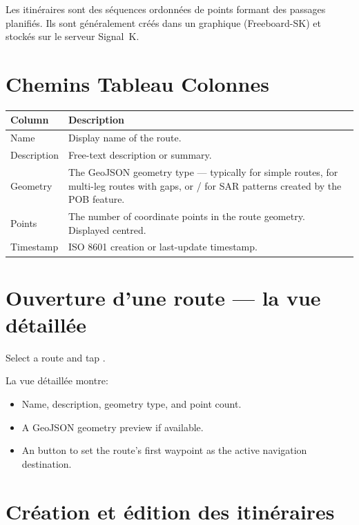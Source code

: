 Les itinéraires sont des séquences ordonnées de points formant des passages planifiés.
Ils sont généralement créés dans un graphique (Freeboard-SK) et stockés sur le serveur Signal~K.


\section{Chemins Tableau Colonnes}

\begin{longtable}{L{2.4cm} L{11.3cm}}
\toprule
{}
{\sffamily\bfseries\color{white} Column} &
{\sffamily\bfseries\color{white} Description} \\
\midrule
Name & Display name of the route. \\
Description & Free-text description or summary. \\
Geometry & The GeoJSON geometry type --- typically  for simple routes,  for multi-leg routes with gaps, or  /  for SAR patterns created by the POB feature. \\
Points & The number of coordinate points in the route geometry. Displayed centred. \\
Timestamp & ISO 8601 creation or last-update timestamp. \\
\bottomrule
\end{longtable}

\section{Ouverture d'une route --- la vue détaillée}

Select a route and tap .


La vue détaillée montre:
\begin{itemize}
  \item Name, description, geometry type, and point count.
  \item A GeoJSON geometry preview if available.
  \item An  button to set the route's first waypoint as the active navigation destination.
\end{itemize}

\section{Création et édition des itinéraires}

